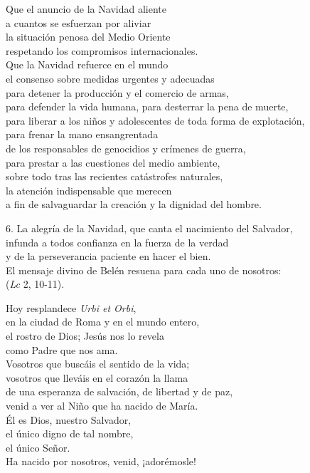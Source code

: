 Que el anuncio de la Navidad aliente\\ a cuantos se esfuerzan por aliviar\\ la situación penosa del Medio Oriente\\ respetando los compromisos internacionales.\\ Que la Navidad refuerce en el mundo\\ el consenso sobre medidas urgentes y adecuadas\\ para detener la producción y el comercio de armas,\\ para defender la vida humana, para desterrar la pena de muerte,\\ para liberar a los niños y adolescentes de toda forma de explotación,\\ para frenar la mano ensangrentada\\ de los responsables de genocidios y crímenes de guerra,\\ para prestar a las cuestiones del medio ambiente,\\ sobre todo tras las recientes catástrofes naturales,\\ la atención indispensable que merecen\\ a fin de salvaguardar la creación y la dignidad del hombre.

6. La alegría de la Navidad, que canta el nacimiento del Salvador,\\ infunda a todos confianza en la fuerza de la verdad\\ y de la perseverancia paciente en hacer el bien.\\ El mensaje divino de Belén resuena para cada uno de nosotros:\\  (\emph{Lc} 2, 10-11).

Hoy resplandece \emph{Urbi et Orbi},\\ en la ciudad de Roma y en el mundo entero,\\ el rostro de Dios; Jesús nos lo revela\\ como Padre que nos ama.\\ Vosotros que buscáis el sentido de la vida;\\ vosotros que lleváis en el corazón la llama\\ de una esperanza de salvación, de libertad y de paz,\\ venid a ver al Niño que ha nacido de María.\\ Él es Dios, nuestro Salvador,\\ el único digno de tal nombre,\\ el único Señor.\\ Ha nacido por nosotros, venid, ¡adorémosle!

